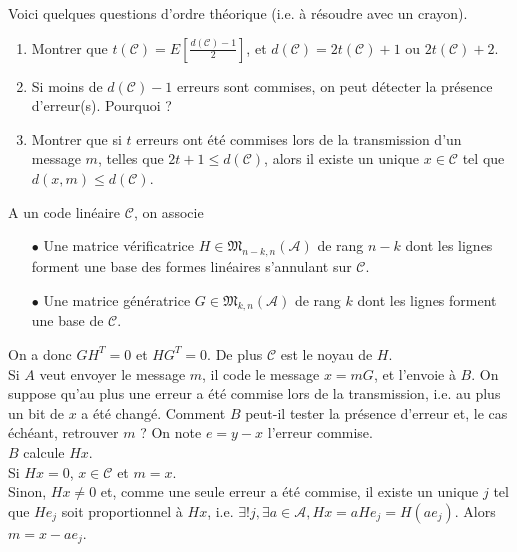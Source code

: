 Voici quelques questions d'ordre théorique (i.e. à résoudre avec un crayon).
\begin{enumerate}
\item Montrer que $t(\mathcal C)=E[\frac{d(\mathcal C)-1}{2}]$, et $d(\mathcal C)=2t(\mathcal C)+1$ ou $2t(\mathcal C)+2$.
\item Si moins de $d(\mathcal C)-1$ erreurs sont commises, on peut détecter la présence d'erreur(s). Pourquoi ?
\item Montrer que si $t$ erreurs ont été commises lors de la transmission d'un message $m$, telles que $2t+1\leq d(\mathcal C)$, alors il existe un unique $x\in \mathcal C$ tel que $d(x,m)\leq d(\mathcal C)$.\\
\end{enumerate}

A un code linéaire $\mathcal C$, on associe
\begin{itemize}
\item[$\bullet$] Une matrice vérificatrice $H\in \mathfrak M_{n-k,n}(\mathcal A)$ de rang $n-k$ dont les lignes forment une base des formes linéaires s'annulant sur $\mathcal C$.
\item[$\bullet$] Une matrice génératrice $G\in \mathfrak M_{k,n}(\mathcal A)$ de rang $k$ dont les lignes forment une base de $\mathcal C$.\\
\end{itemize}

On a donc $GH^T = 0$ et $HG^T=0$. De plus $\mathcal C$ est le noyau de $H$. \\

Si $A$ veut envoyer le message $m$, il code le message $x=mG$, et l'envoie à $B$. On suppose qu'au plus une erreur a été commise lors de la transmission, i.e. au plus un bit de $x$ a été changé. Comment $B$ peut-il tester la présence d'erreur et, le cas échéant, retrouver $m$ ? On note $e=y-x$ l'erreur commise.\\

$B$ calcule $Hx$. \\
Si $Hx=0$, $x\in \mathcal C$ et $m=x$.\\
Sinon, $Hx\neq 0$ et, comme une seule erreur a été commise, il existe un unique $j$ tel que $He_j$ soit proportionnel à $Hx$, i.e. $\exists ! j, \exists a\in \mathcal A, Hx=aHe_j = H(ae_j)$. Alors $m=x-ae_j$.\\

